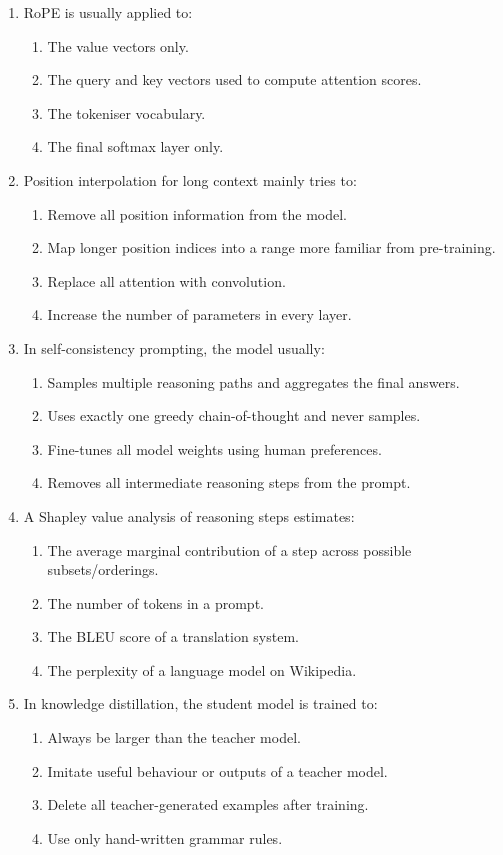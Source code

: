 \documentclass[11pt,a4paper]{article}
\begin{document}
\begin{enumerate}[leftmargin=*]
\begin{enumerate}
\item RoPE is usually applied to:
\begin{enumerate}[label=\Alph*.]
\item The value vectors only.
\item The query and key vectors used to compute attention scores.
\item The tokeniser vocabulary.
\item The final softmax layer only.
\end{enumerate}

\item Position interpolation for long context mainly tries to:
\begin{enumerate}[label=\Alph*.]
\item Remove all position information from the model.
\item Map longer position indices into a range more familiar from pre-training.
\item Replace all attention with convolution.
\item Increase the number of parameters in every layer.
\end{enumerate}

\item In self-consistency prompting, the model usually:
\begin{enumerate}[label=\Alph*.]
\item Samples multiple reasoning paths and aggregates the final answers.
\item Uses exactly one greedy chain-of-thought and never samples.
\item Fine-tunes all model weights using human preferences.
\item Removes all intermediate reasoning steps from the prompt.
\end{enumerate}

\item A Shapley value analysis of reasoning steps estimates:
\begin{enumerate}[label=\Alph*.]
\item The average marginal contribution of a step across possible subsets/orderings.
\item The number of tokens in a prompt.
\item The BLEU score of a translation system.
\item The perplexity of a language model on Wikipedia.
\end{enumerate}

\item In knowledge distillation, the student model is trained to:
\begin{enumerate}[label=\Alph*.]
\item Always be larger than the teacher model.
\item Imitate useful behaviour or outputs of a teacher model.
\item Delete all teacher-generated examples after training.
\item Use only hand-written grammar rules.
\end{enumerate}


\end{enumerate}
\end{enumerate}
\end{document}
